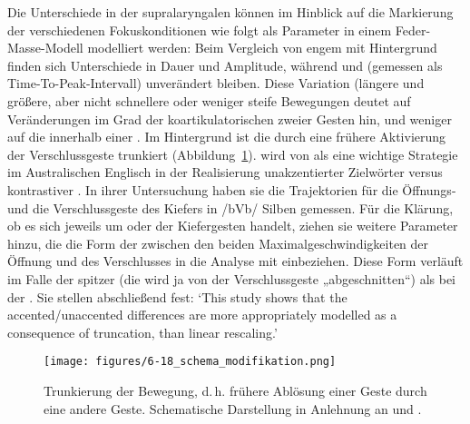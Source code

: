 Die Unterschiede in der supralaryngalen  können im Hinblick auf die Markierung der verschiedenen Fokuskonditionen wie folgt als Parameter in einem Feder-Masse-Modell modelliert werden: Beim Vergleich von engem  mit Hintergrund finden sich Unterschiede in Dauer und Amplitude, während  und  (gemessen als Time-To-Peak-Intervall) unverändert bleiben. Diese Variation (längere und größere, aber nicht schnellere oder weniger steife Bewegungen deutet auf Veränderungen im Grad der koartikulatorischen  zweier Gesten hin, und weniger auf die  innerhalb einer . Im Hintergrund ist die  durch eine frühere Aktivierung der Verschlussgeste trunkiert (Abbildung~\ref{figure:0616}).  wird von \citealt[][305]{Harrington1995} als eine wichtige Strategie im Australischen Englisch in der Realisierung unakzentierter Zielwörter versus kontrastiver . In ihrer Untersuchung haben sie die Trajektorien für die Öffnungs- und die Verschlussgeste des Kiefers in /bVb/ Silben gemessen. Für die Klärung, ob es sich jeweils um  oder  der Kiefergesten handelt, ziehen sie weitere Parameter hinzu, die die Form der  zwischen den beiden Maximalgeschwindigkeiten der Öffnung und des Verschlusses in die Analyse mit einbeziehen. Diese Form verläuft im Falle der  spitzer (die  wird ja von der Verschlussgeste „abgeschnitten“) als bei der . Sie stellen abschließend fest: ‘This study shows that the accented/unaccented differences are more appropriately modelled as a consequence of truncation, than linear rescaling.’


\begin{figure}
	\texttt{[image: figures/6-18\_schema\_modifikation.png]}
	\caption{Trunkierung der Bewegung, d.\,h. frühere Ablösung einer Geste durch eine andere Geste. Schematische Darstellung in Anlehnung an \citet[71]{Beckman1992} und \citet[17]{Cho2002a}.}
	\label{figure:0616}
\end{figure}


